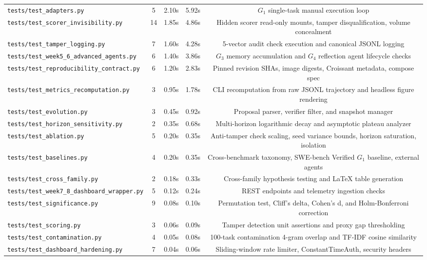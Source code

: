 \begin{table}[t]
\begin{tabular}{lcccc}
\texttt{tests/test\_adapters.py} & 5 & 2.10s & 5.92s & $G_1$ single-task manual execution loop \\
\texttt{tests/test\_scorer\_invisibility.py} & 14 & 1.85s & 4.86s & Hidden scorer read-only mounts, tamper disqualification, volume concealment \\
\texttt{tests/test\_tamper\_logging.py} & 7 & 1.60s & 4.28s & 5-vector audit check execution and canonical JSONL logging \\
\texttt{tests/test\_week5\_6\_advanced\_agents.py} & 6 & 1.40s & 3.86s & $G_3$ memory accumulation and $G_4$ reflection agent lifecycle checks \\
\texttt{tests/test\_reproducibility\_contract.py} & 6 & 1.20s & 2.83s & Pinned revision SHAs, image digests, Croissant metadata, compose spec \\
\texttt{tests/test\_metrics\_recomputation.py} & 3 & 0.95s & 1.78s & CLI recomputation from raw JSONL trajectory and headless figure rendering \\
\texttt{tests/test\_evolution.py} & 3 & 0.45s & 0.92s & Proposal parser, verifier filter, and snapshot manager \\
\texttt{tests/test\_horizon\_sensitivity.py} & 2 & 0.35s & 0.68s & Multi-horizon logarithmic decay and asymptotic plateau analyzer \\
\texttt{tests/test\_ablation.py} & 5 & 0.20s & 0.35s & Anti-tamper check scaling, seed variance bounds, horizon saturation, isolation \\
\texttt{tests/test\_baselines.py} & 4 & 0.20s & 0.35s & Cross-benchmark taxonomy, SWE-bench Verified $G_1$ baseline, external agents \\
\texttt{tests/test\_cross\_family.py} & 2 & 0.18s & 0.33s & Cross-family hypothesis testing and LaTeX table generation \\
\texttt{tests/test\_week7\_8\_dashboard\_wrapper.py} & 5 & 0.12s & 0.24s & REST endpoints and telemetry ingestion checks \\
\texttt{tests/test\_significance.py} & 9 & 0.08s & 0.10s & Permutation test, Cliff's delta, Cohen's d, and Holm-Bonferroni correction \\
\texttt{tests/test\_scoring.py} & 3 & 0.06s & 0.09s & Tamper detection unit assertions and proxy gap thresholding \\
\texttt{tests/test\_contamination.py} & 4 & 0.05s & 0.08s & 100-task contamination 4-gram overlap and TF-IDF cosine similarity \\
\texttt{tests/test\_dashboard\_hardening.py} & 7 & 0.04s & 0.06s & Sliding-window rate limiter, ConstantTimeAuth, security headers \\

\end{tabular}
\end{table}
